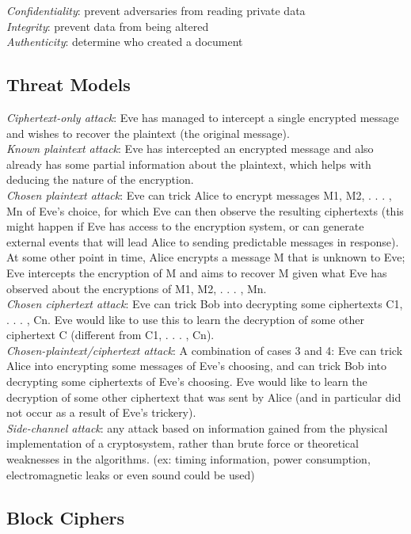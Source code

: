 \documentclass[10pt,landscape]{article}
\begin{document}
\begin{multicols}{3}
\textit{Confidentiality}: prevent adversaries from reading private data \\
\textit{Integrity}: prevent data from being altered \\
\textit{Authenticity}: determine who created a document

\subsection{Threat Models}

\textit{Ciphertext-only attack}: Eve has managed to intercept a single encrypted message and wishes to recover the plaintext (the original message). \\
\textit{Known plaintext attack}: Eve has intercepted an encrypted message and also already has some partial information about the plaintext, which helps with deducing the nature of the encryption. \\
\textit{Chosen plaintext attack}: Eve can trick Alice to encrypt messages M1, M2, . . . , Mn of Eve’s choice, for which Eve can then observe the resulting ciphertexts (this might happen if Eve has access to the encryption system, or can generate external events that will lead Alice to sending predictable messages in response). At some other point in time, Alice encrypts a message M that is unknown to Eve; Eve intercepts the encryption of M and aims to recover M given what Eve has observed about the encryptions of M1, M2, . . . , Mn. \\
\textit{Chosen ciphertext attack}: Eve can trick Bob into decrypting some ciphertexts C1, . . . , Cn. Eve would like to use this to learn the decryption of some other ciphertext C (different from C1, . . . , Cn). \\
\textit{Chosen-plaintext/ciphertext attack}: A combination of cases 3 and 4: Eve can trick Alice into encrypting some messages of Eve’s choosing, and can trick Bob into decrypting some ciphertexts of Eve’s choosing. Eve would like to learn the decryption of some other ciphertext that was sent by Alice (and in particular did not occur as a result of Eve’s trickery). \\
\textit{Side-channel attack}: any attack based on information gained from the physical implementation of a cryptosystem, rather than brute force or theoretical weaknesses in the algorithms. (ex: timing information, power consumption, electromagnetic leaks or even sound could be used)


\subsection{Block Ciphers}


\end{multicols}
\end{document}
